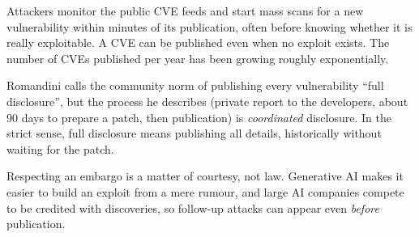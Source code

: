 Attackers monitor the public CVE feeds and start mass scans for a new vulnerability within minutes of its publication, often before knowing whether it is really exploitable. A CVE can be published even when no exploit exists. The number of CVEs published per year has been growing roughly exponentially.

\begin{remark}[Terminology]
Romandini calls the community norm of publishing every vulnerability \enquote{full disclosure}, but the process he describes (private report to the developers, about 90 days to prepare a patch, then publication) is \emph{coordinated} disclosure. In the strict sense, full disclosure means publishing all details, historically without waiting for the patch.
\end{remark}

\begin{remark}
Respecting an embargo is a matter of courtesy, not law. Generative AI makes it easier to build an exploit from a mere rumour, and large AI companies compete to be credited with discoveries, so follow-up attacks can appear even \emph{before} publication.
\end{remark}

